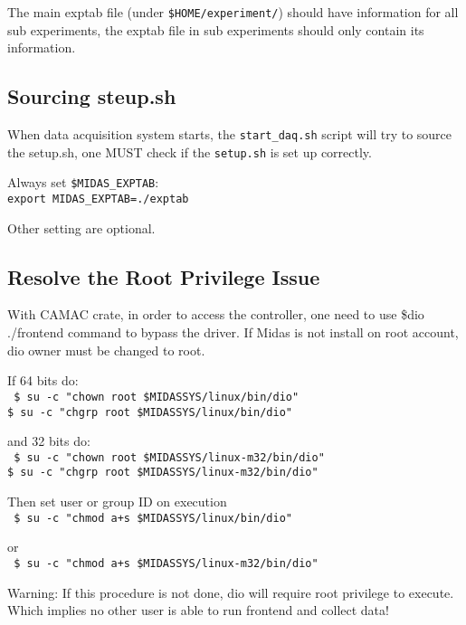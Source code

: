 \documentclass[12pt, letterpaper]{article}
\newcommand{\longindent}{\hangindent=1.01cm}
\begin{document}
The main exptab file (under \texttt{\$HOME/experiment/}) should have information for all sub experiments, the exptab file in sub experiments should only contain its information.




\subsection{Sourcing steup.sh}

 
When data acquisition system starts, the \texttt{start\_daq.sh} script will try to source the setup.sh, one MUST check if the \texttt{setup.sh} is set up correctly. 

Always set \texttt{\$MIDAS\_EXPTAB}: \\
\longindent \texttt{export MIDAS\_EXPTAB=./exptab}


Other setting are optional.



\subsection{Resolve the Root Privilege Issue}

With CAMAC crate, in order to access the controller, one need to use
\$dio ./frontend
command to bypass the driver. If Midas is not install on root account, dio owner must be changed to root.

If 64 bits do:\\
\longindent \texttt{
\$ su -c "chown root \$MIDASSYS/linux/bin/dio"\\
\$ su -c "chgrp root \$MIDASSYS/linux/bin/dio"}

and 32 bits do:\\
\longindent \texttt{
\$ su -c "chown root \$MIDASSYS/linux-m32/bin/dio"\\
\$ su -c "chgrp root \$MIDASSYS/linux-m32/bin/dio"}

Then set user or group ID on execution \\
\longindent \texttt{
\$ su -c "chmod a+s \$MIDASSYS/linux/bin/dio"}

or \\
\longindent \texttt{
\$ su -c "chmod a+s \$MIDASSYS/linux-m32/bin/dio"}

Warning: If this procedure is not done, dio will require root privilege to execute. Which implies no other user is able to run frontend and collect data!
\end{document}
